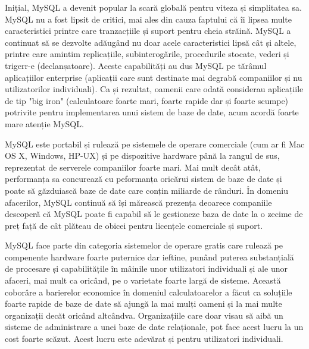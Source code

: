 \documentclass[12pt]{book}
\begin{document}
Inițial, MySQL a devenit popular la scară globală pentru viteza și simplitatea sa. MySQL nu a fost lipsit de critici, mai ales din cauza faptului că îi lipsea multe caracteristici printre care tranzacțiile și suport pentru cheia străină. MySQL a continuat să se dezvolte adăugând nu doar acele caracteristici lipsă cât și altele, printre care amintim replicațiile, subinterogările, procedurile stocate, vederi și trigerr-e (declanșatoare). Aceste capabilități au dus MySQL pe tărâmul aplicațiilor enterprise (aplicații care sunt destinate mai degrabă companiilor și nu utilizatorilor individuali). Ca și rezultat, oamenii care odată considerau aplicațiile de tip "big iron" (calculatoare foarte mari, foarte rapide dar și foarte scumpe) potrivite pentru implementarea unui sistem de baze de date, acum acordă foarte mare atenție MySQL. 

MySQL este portabil și rulează pe sistemele de operare comerciale (cum ar fi Mac OS X, Windows, HP-UX) și pe dispozitive hardware până la rangul de sus, reprezentat de serverele companiilor foarte mari. Mai mult decât atât, performanța sa concurează cu peformanța oricărui sistem de baze de date și poate să găzduiască baze de date care conțin miliarde de rânduri. În domeniu afacerilor, MySQL continuă să își mărească prezența deoarece companiile descoperă că MySQL poate fi capabil să le gestioneze baza de date la o zecime de preț față de cât plăteau de obicei pentru licențele comerciale și suport.

MySQL face parte din categoria sistemelor de operare gratis care rulează pe compenente hardware foarte puternice dar ieftine, punând puterea substanțială de procesare și capabilitățile în mâinile unor utilizatori individuali și ale unor afaceri, mai mult ca oricând, pe o varietate foarte largă de sisteme. Această coborâre a barierelor economice în domeniul calculatoarelor a făcut ca soluțiile foarte rapide de baze de date să ajungă la mai mulți oameni și la mai multe organizații decăt oricând altcândva. Organizațiile care doar visau să aibă un sisteme de administrare a unei baze de date relaționale, pot face acest lucru la un cost foarte scăzut. Acest lucru este adevărat și pentru utilizatori individuali.
\end{document}
